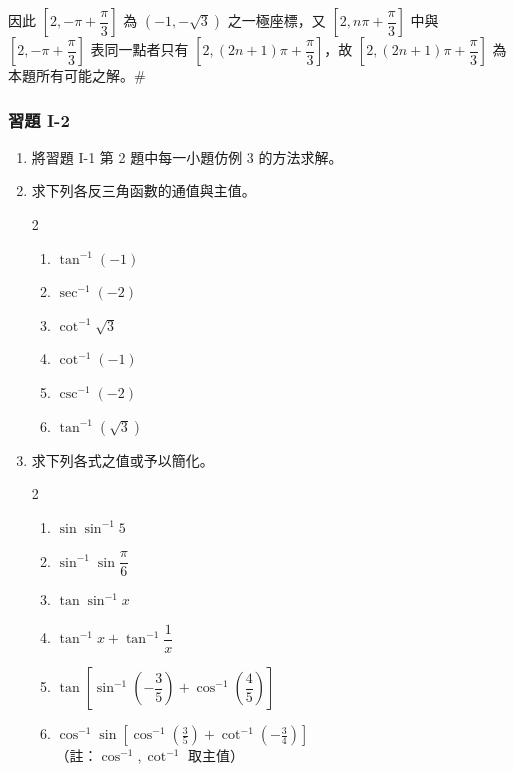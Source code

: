 因此 $\left[2, -\pi + \dfrac{\pi}{3}\right]$ 為 $(-1, -\sqrt{3})$ 之一極座標，又 $\left[2, n\pi + \dfrac{\pi}{3}\right]$ 中與 $\left[2, -\pi + \dfrac{\pi}{3}\right]$ 表同一點者只有 $\left[2, (2n+1)\pi + \dfrac{\pi}{3}\right]$，故 $\left[2, (2n+1)\pi + \dfrac{\pi}{3}\right]$ 為本題所有可能之解。\hfill $\#$

\subsubsection*{習題 I-2}\label{sec:b5s-ex1-2}

\begin{enumerate}[label=\arabic*., topsep=4pt, itemsep=6pt]
  \item 將習題 I-1 第 2 題中每一小題仿例 3 的方法求解。

  \item 求下列各反三角函數的通值與主值。
  \begin{multicols}{2}
  \begin{enumerate}[label=(\alph*), topsep=2pt, itemsep=4pt]
    \item $\tan^{-1}(-1)$
    \item $\sec^{-1}(-2)$
    \item $\cot^{-1}\sqrt{3}$
    \item $\cot^{-1}(-1)$
    \item $\csc^{-1}(-2)$
    \item $\tan^{-1}(\sqrt{3})$
  \end{enumerate}
  \end{multicols}

  \item 求下列各式之值或予以簡化。
  \begin{multicols}{2}
  \begin{enumerate}[label=(\alph*), topsep=2pt, itemsep=4pt]
    \item $\sin \sin^{-1} 5$
    \item $\sin^{-1} \sin \dfrac{\pi}{6}$
    \item $\tan \sin^{-1} x$
    \item $\tan^{-1} x + \tan^{-1} \dfrac{1}{x}$
    \item $\tan\left[\sin^{-1}\left(-\dfrac{3}{5}\right) + \cos^{-1}\left(\dfrac{4}{5}\right)\right]$
    \item $\cos^{-1} \sin\left[\cos^{-1}\left(\tfrac{3}{5}\right) + \cot^{-1}\left(-\tfrac{3}{4}\right)\right]$ \\
    {\small（註：$\cos^{-1}, \cot^{-1}$ 取主值）}
  \end{enumerate}
  \end{multicols}


\end{enumerate}
